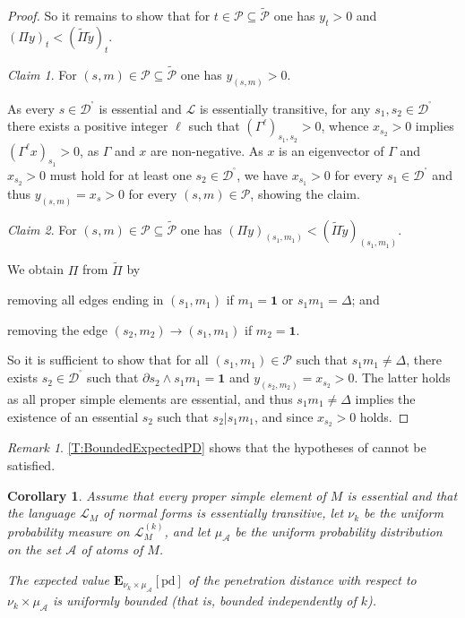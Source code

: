 \documentclass[a4paper,final]{article}
\theoremstyle{plain}
\newtheorem{corollary}[corollary]{Corollary}
\theoremstyle{remark}
\newtheorem*{claim*}{Claim}
\newtheorem*{remark}{Remark}
\theoremstyle{definition}
\begin{document}
\begin{proof}
So it remains to show that for $t\in\mathcal{P}\subseteq\widetilde{\mathcal{P}}$ one has $y_t > 0$ and
$({\Pi} y)_t < (\widetilde{\Pi}\widetilde{y})_t$.\medskip

\begin{claim*}
For $(s,m)\in\mathcal{P}\subseteq\widetilde{\mathcal{P}}$ one has $y_{(s,m)} > 0$.
\end{claim*}
\noindent
As every $s\in{{\mathcal{D}}^{\!{}^{\circ}\!}}$ is essential and ${\mathcal{L}}$ is essentially transitive,
for any $s_1,s_2\in{{\mathcal{D}}^{\!{}^{\circ}\!}}$ there exists a positive integer $\ell$ such that $(\Gamma^\ell)_{s_1,s_2}>0$, whence $x_{s_2}>0$ implies $(\Gamma^\ell x)_{s_1}>0$, as $\Gamma$ and $x$ are non-negative.  As $x$ is an eigenvector of $\Gamma$ and $x_{s_2}>0$ must hold for at least one $s_2\in{{\mathcal{D}}^{\!{}^{\circ}\!}}$, we have $x_{s_1}>0$ for every $s_1\in{{\mathcal{D}}^{\!{}^{\circ}\!}}$ and thus $y_{(s,m)}=x_{s}>0$ for every $(s,m)\in\mathcal{P}$, showing the claim.
\medskip

\begin{claim*}
For $(s,m)\in\mathcal{P}\subseteq\widetilde{\mathcal{P}}$ one has
$({\Pi} y)_{(s_1,m_1)} < (\widetilde{\Pi}\widetilde{y})_{(s_1,m_1)}$.
{}
\end{claim*}
\noindent
We obtain ${\Pi}$ from $\widetilde{\Pi}$ by
\begin{inparaenum}[1.)]
 \item removing all edges ending in $(s_1,m_1)$ if $m_1={\mathbf{1}}$ or $s_1m_1=\Delta$; and
 \item removing the edge $(s_2,m_2)\to (s_1,m_1)$ if $m_2={\mathbf{1}}$.
\end{inparaenum}

So it is sufficient to show that for all $(s_1,m_1)\in\mathcal{P}$ such that $s_1m_1\ne\Delta$, there exists $s_2\in{{\mathcal{D}}^{\!{}^{\circ}\!}}$ such that $\partial s_2\wedge s_1m_1={\mathbf{1}}$ and $y_{(s_2,m_2)}=x_{s_2}>0$.
The latter holds as all proper simple elements are essential, and thus $s_1m_1\ne\Delta$ implies the existence of an essential $s_2$ such that $s_2|s_1m_1$, and since $x_{s_2}>0$ holds.
\end{proof}

\begin{remark}
\autoref{T:BoundedExpectedPD} shows that the hypotheses of \cite[Theorem~4.8]{GT13} cannot be satisfied.
\end{remark}

\begin{corollary}\label{C:BoundedExpectedPD}
Assume that every proper simple element of $M$ is essential and that the language ${\mathcal{L}}_M$ of normal forms is essentially transitive, let $\nu_{k}$ be the uniform probability measure on ${\mathcal{L}}_M^{(k)}$, and let $\mu_{\mathcal{A}}$ be the uniform probability distribution on the set ${\mathcal{A}}$ of atoms of $M$.

The expected value $\mathbf{E}_{\nu_{k} \times \mu_{\mathcal{A}}}[{\mathrm{pd}}]$ of the penetration distance with respect to $\nu_k\times \mu_{\mathcal{A}}$ is uniformly bounded (that is, bounded independently of $k$).
\end{corollary}
\end{document}
